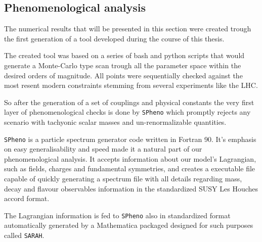 


\subsection{Phenomenological analysis}


The numerical results that will be presented in this section were created trough the first generation of a tool developed during the course of this thesis.

The created tool was based on a series of bash and python scripts that would generate a Monte-Carlo type scan trough all the parameter space within the desired orders of magnitude. All points were sequentially checked against the most resent modern constraints stemming from several experiments like the LHC. 


So after the generation of a set of couplings and physical constants the very first layer of phenomenological checks is done by \texttt{SPheno} which promptly rejects any scenario with tachyonic scalar masses and un-renormalizable quantities.  

\texttt{SPheno} is a particle spectrum generator code written in Fortran 90. It's emphasis on easy generalisability and speed made it a natural part of our phenomenological analysis. It accepts information about our model's Lagrangian, such as fields, charges and fundamental symmetries, and creates a executable file capable of quickly generating a spectrum file with all details regarding mass, decay and flavour observables information in the standardized SUSY Les Houches accord format. 

The Lagrangian information is fed to \texttt{SPheno} also in standardized format automatically generated by a Mathematica packaged designed for such purposes called \texttt{SARAH}. 

